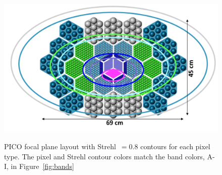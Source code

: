 \documentclass[]{spie}  %
\newcommand{\comb}[1]{\textcolor{blue}{#1}}
\begin{document}
\begin{figure} [ht]
\begin{center}
\includegraphics[height=7.5cm]{version3_focal_plane.png}
\end{center}
\caption { \label{fig:focal_plane} 
PICO focal plane layout with Strehl~$=0.8$ contours for each pixel type. The pixel and Strehl contour colors match the band colors, A-I, 
in Figure~\ref{fig:bands} }
\end{figure} 



\end{document}
